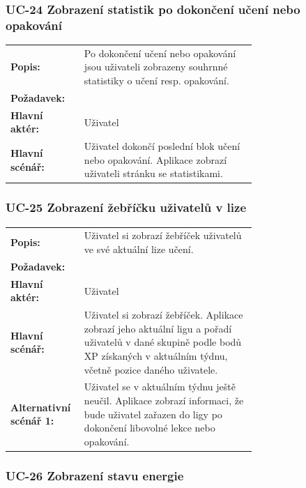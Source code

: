 \subsubsection{UC-24 Zobrazení statistik po dokončení učení nebo opakování}

\begin{tabular}{lp{0.7\linewidth}}
  \textbf{Popis:} & Po dokončení učení nebo opakování jsou uživateli zobrazeny souhrnné statistiky o učení resp. opakování. \\
  \textbf{Požadavek:} & \nameref{sec:fp-learning-stats} \\
  \textbf{Hlavní aktér:} & Uživatel \\
  \textbf{Hlavní scénář:} & Uživatel dokončí poslední blok učení nebo opakování. Aplikace zobrazí uživateli stránku se statistikami. \\
\end{tabular}


\subsubsection{UC-25 Zobrazení žebříčku uživatelů v lize}

\begin{tabular}{lp{0.7\linewidth}}
  \textbf{Popis:} & Uživatel si zobrazí žebříček uživatelů ve své aktuální lize učení. \\
  \textbf{Požadavek:} & \nameref{sec:fp-leaderboard} \\
  \textbf{Hlavní aktér:} & Uživatel \\
  \textbf{Hlavní scénář:} & Uživatel si zobrazí žebříček. Aplikace zobrazí jeho aktuální ligu a pořadí uživatelů v dané skupině podle bodů XP získaných v aktuálním týdnu, včetně pozice daného uživatele. \\
  \textbf{Alternativní scénář 1:} & Uživatel se v aktuálním týdnu ještě neučil. Aplikace zobrazí informaci, že bude uživatel zařazen do ligy po dokončení libovolné lekce nebo opakování. \\
\end{tabular}


\subsubsection{UC-26 Zobrazení stavu energie}


